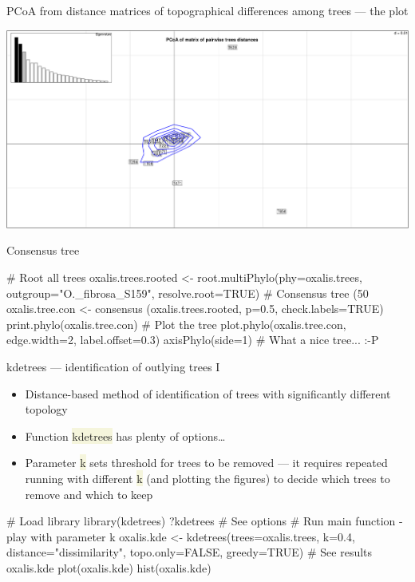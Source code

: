 \documentclass[compress, ucs, xelatex, 11pt, xcolor=svgnames, aspectratio=169,
	hyperref={
		bookmarks=true,
		unicode=true,
		colorlinks=true,
		pdftitle={Molecular data in R},
		plainpages=false,
		pdfauthor={Vojtech Zeisek},
		pdfsubject={Course about phylogeny and evolution in R},
		pdfcreator={XeLaTeX},
		pdfkeywords={R, evolution, phylogeny, molecular data},
		linkcolor=Crimson, %
		anchorcolor=Magenta, %
		citecolor=Magenta, %
		filecolor=Magenta, %
		menucolor=Magenta, %
		urlcolor=DodgerBlue, %
		pdftex},
	url={hyphens, lowtilde} %
	]{beamer}
\renewcommand{\texttt}[1]{\colorbox{Beige}{{\ttfamily #1}}}
\begin{document}
\begin{frame}{PCoA from distance matrices of topographical differences among trees --- the plot}
	\begin{center}
		\includegraphics[width=\textwidth-3.5cm]{pcoa-trees.png}
	\end{center}
\end{frame}

\begin{frame}[fragile]{Consensus tree}
	\begin{multicols}{2}
		\begin{center}
			\texttt{[image: oxalis-cons.png]}
		\end{center}
		\begin{spluscode}
    # Root all trees
    oxalis.trees.rooted <-
      root.multiPhylo(phy=oxalis.trees,
      outgroup="O._fibrosa_S159",
      resolve.root=TRUE)
    # Consensus tree (50 %
    oxalis.tree.con <- consensus
      (oxalis.trees.rooted, p=0.5,
      check.labels=TRUE)
    print.phylo(oxalis.tree.con)
    # Plot the tree
    plot.phylo(oxalis.tree.con,
      edge.width=2, label.offset=0.3)
    axisPhylo(side=1)
    # What a nice tree... :-P
		\end{spluscode}
	\end{multicols}
\end{frame}

\begin{frame}[fragile]{kdetrees --- identification of outlying trees I}
	\begin{itemize}
		\item Distance-based method of identification of trees with significantly different topology
		\item Function \texttt{kdetrees} has plenty of options\ldots
		\item Parameter \texttt{k} sets threshold for trees to be removed --- it requires repeated running with different \texttt{k} (and plotting the figures) to decide which trees to remove and which to keep
	\end{itemize}
	\begin{spluscode}
    # Load library
    library(kdetrees)
    ?kdetrees # See options
    # Run main function - play with parameter k
    oxalis.kde <- kdetrees(trees=oxalis.trees, k=0.4, distance="dissimilarity",
      topo.only=FALSE, greedy=TRUE)
    # See results
    oxalis.kde
    plot(oxalis.kde)
    hist(oxalis.kde)
	\end{spluscode}
\end{frame}
\end{document}
